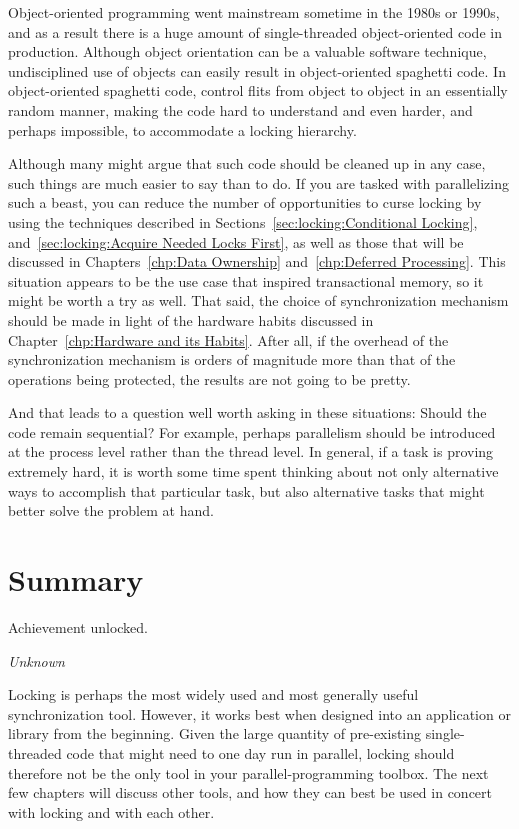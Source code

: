 Object-oriented programming went mainstream sometime in the 1980s or
1990s, and as a result there is a huge amount of single-threaded
object-oriented code in production.
Although object orientation can be a valuable software technique,
undisciplined use of objects can easily result in object-oriented
spaghetti code.
In object-oriented spaghetti code, control flits from object to object
in an essentially random manner, making the code hard to understand
and even harder, and perhaps impossible, to accommodate a locking hierarchy.

Although many might argue that such code should be cleaned up in any
case, such things are much easier to say than to do.
If you are tasked with parallelizing such a beast, you can reduce the
number of opportunities to curse locking by using the techniques
described in
Sections~\ref{sec:locking:Conditional Locking},
and~\ref{sec:locking:Acquire Needed Locks First},
as well as those that will be discussed in
Chapters~\ref{chp:Data Ownership}
and~\ref{chp:Deferred Processing}.
This situation appears to be the use case that inspired transactional
memory, so it might be worth a try as well.
That said, the choice of synchronization mechanism should be made in
light of the hardware habits discussed in
Chapter~\ref{chp:Hardware and its Habits}.
After all, if the overhead of the synchronization mechanism is orders of
magnitude more than that of the operations being protected, the results
are not going to be pretty.

And that leads to a question well worth asking in these situations:
Should the code remain sequential?
For example, perhaps parallelism should be introduced at the process level
rather than the thread level.
In general, if a task is proving extremely hard, it is worth some time
spent thinking about not only alternative ways to accomplish that
particular task, but also alternative tasks that might better solve
the problem at hand.

\section{Summary}
\label{sec:locking:Summary}
%
\epigraph{Achievement unlocked.}{\emph{Unknown}}

Locking is perhaps the most widely used and most generally useful
synchronization tool.
However, it works best when designed into an application
or library from the beginning.
Given the large quantity of pre-existing single-threaded code that might
need to one day run in parallel, locking should therefore not be the
only tool in your parallel-programming toolbox.
The next few chapters will discuss other tools, and how they can best
be used in concert with locking and with each other.

